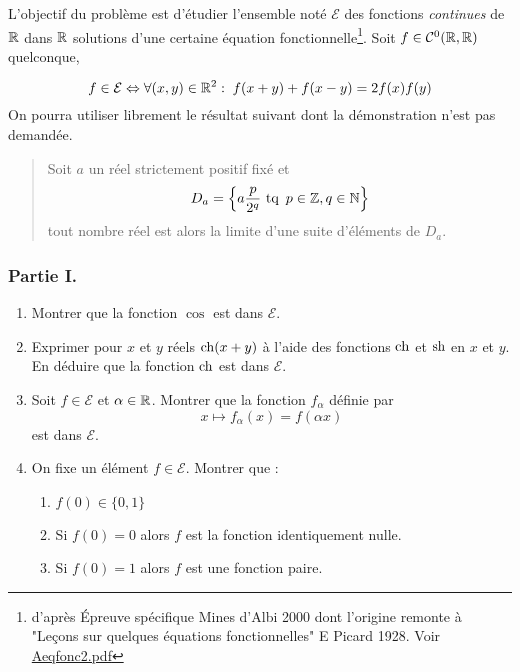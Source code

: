 L'objectif du problème est d'étudier l'ensemble noté $\mathcal E$ des fonctions \emph{continues} de $\mathbb{R}$ dans $\mathbb{R}$ solutions d'une certaine équation fonctionnelle\footnote{d'après \'Epreuve spécifique Mines d'Albi 2000 dont l'origine remonte à "Leçons sur quelques équations fonctionnelles" E Picard 1928. Voir \href{\baseurl Aeqfonc3.pdf}{Aeqfonc2.pdf}}. Soit $f\in \mathcal C ^0(\mathbb{R},\mathbb{R})$ quelconque,

\begin{displaymath}
 f\in \mathcal E \Leftrightarrow \forall(x,y)\in \mathbb{R}^2 :\; f(x+y)+f(x-y) = 2f(x)f(y)
\end{displaymath}
On pourra utiliser librement le résultat suivant dont la démonstration n'est pas demandée.
\begin{quotation}
Soit $a$ un réel strictement positif fixé et
\[D_a=\left\{a\frac{p}{2^q}\text{ tq }\, p\in\mathbb{Z}, q\in \mathbb{N} \right\}\]
tout nombre réel est alors la limite d'une suite d'éléments de $D_a$. 
\end{quotation}

\subsubsection*{Partie I.}
\begin{enumerate}
\item Montrer que la fonction $\cos$ est dans $\mathcal{E}$.
\item Exprimer pour $x$ et $y$ réels $\operatorname{ch} (x+y)$ à l'aide des fonctions $\operatorname{ch}$ et $\operatorname{sh}$ en $x$ et $y$. En déduire que la fonction $\operatorname{ch}$ est dans $\mathcal{E}$.
\item Soit $f\in \mathcal {E}$ et $\alpha \in \mathbb{R}$. Montrer que la fonction $f_\alpha$ définie par
\[x\mapsto f_\alpha (x)=f(\alpha x)\]
est dans $\mathcal{E}$.
\item On fixe un élément $f\in \mathcal{E}$. Montrer que :
\begin{enumerate}
\item $f(0)\in\{0,1\}$
\item Si $f(0)=0$ alors $f$ est la fonction identiquement nulle.
\item Si $f(0)=1$ alors $f$ est une fonction paire.
\end{enumerate}
\end{enumerate}

